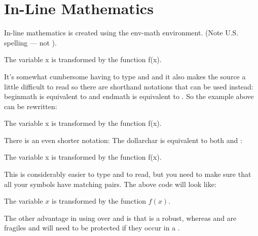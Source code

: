 
\section{In-Line Mathematics}
\label{sec:inline}

In-line mathematics is created using the \gls{env-math}
environment. (Note U.S. spelling ---  not ).

\begin{code}
The variable x is transformed
by the function f(x).
\end{code}
It's somewhat cumbersome having to type
 and  and it also
makes the \gls{source} a little difficult to read so there
are shorthand notations that can be used instead:
\gls{beginmath} is equivalent to  and
\gls{endmath} is equivalent to .  So
the example above can be rewritten:
\begin{codeS}
The variable x is transformed by the function 
f(x).
\end{codeS}%
There is an even shorter notation:
The  \gls{dollarchar} is equivalent
to both  and :
\begin{codeS}
The variable x is transformed by the 
function f(x).
\end{codeS}%
This is considerably easier to type and
to read, but you need to make sure that all your 
symbols have matching pairs.  The above code will look like:
\begin{resultS}
The variable $x$ is transformed
by the function $f(x)$.
\end{resultS}%
The other advantage in using  over  and
 is that  is a \gls{robust}, 
whereas  and  are 
\glspl{fragile} and
will need to be protected if they occur in a .

